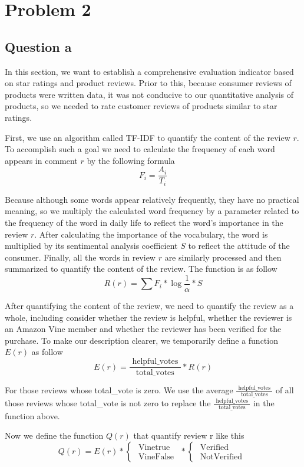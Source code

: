 \documentclass[12pt]{mcmthesis}
\begin{document}
\section{Problem 2}

\subsection{Question a}
In this section, we want to establish a comprehensive evaluation indicator based on star ratings and product reviews. Prior to this, because consumer reviews of products were written data, it was not conducive to our quantitative analysis of products, so we needed to rate customer reviews of products similar to star ratings.

First, we use an algorithm called TF-IDF to quantify the content of the review $r$. \cite{1} To accomplish such a goal we need to calculate the frequency of each word appears in comment $r$ by the following formula$$F_{i}=\frac{A_{i}}{T_{i}}$$


Because although some words appear relatively frequently, they have no practical meaning, so we multiply the calculated word frequency by a parameter related to the frequency of the word in daily life to reflect the word's importance in the review $r$. After calculating the importance of the vocabulary, the word is multiplied by its sentimental analysis coefficient $S$ \cite{2} to reflect the attitude of the consumer. Finally, all the words in review $r$ are similarly processed and then summarized to quantify the content of the review. The function is as follow$$R(r)=\sum F_{i} * \log \frac{1}{\alpha} * S$$

After quantifying the content of the review, we need to quantify the review as a whole, including consider whether the review is helpful, whether the reviewer is an Amazon Vine member and whether the reviewer has been verified for the purchase. To make our description clearer, we temporarily define a function $E(r)$ as follow $$E(r)=\frac{\text { helpful\_votes }}{\text { total\_votes }} * R(r)$$

For those reviews whose total\_vote is zero. We use the average $\frac{\text { helpful\_votes }}{\text { total\_votes }}$ of all those reviews whose total\_vote is not zero to replace the $\frac{\text { helpful\_votes }}{\text { total\_votes }}$ in the function above.

Now we define the function $Q(r)$ that quantify review r like this $$Q(r)=E(r) *\left\{\begin{array}{ll}
\text { Vinetrue } \\
\text { VineFalse }
\end{array}\right.*
\left\{\begin{array}{ll}
\text { Verified } \\
\text { NotVerified }
\end{array}\right.$$
\end{document}
